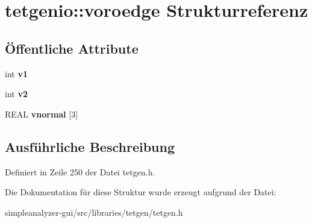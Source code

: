 \hypertarget{structtetgenio_1_1voroedge}{\section{tetgenio\-:\-:voroedge Strukturreferenz}
\label{structtetgenio_1_1voroedge}
}
\subsection*{Öffentliche Attribute}
\begin{DoxyCompactItemize}
\item 
\hypertarget{structtetgenio_1_1voroedge_a2c18bda2392af5f81bc790a2c0ea3139}{int {\bfseries v1}}\label{structtetgenio_1_1voroedge_a2c18bda2392af5f81bc790a2c0ea3139}

\item 
\hypertarget{structtetgenio_1_1voroedge_a19a27882ca68a89123965f7b08e05d55}{int {\bfseries v2}}\label{structtetgenio_1_1voroedge_a19a27882ca68a89123965f7b08e05d55}

\item 
\hypertarget{structtetgenio_1_1voroedge_afea78ad75784a868068e6d86c21531a3}{R\-E\-A\-L {\bfseries vnormal} \mbox{[}3\mbox{]}}\label{structtetgenio_1_1voroedge_afea78ad75784a868068e6d86c21531a3}

\end{DoxyCompactItemize}


\subsection{Ausführliche Beschreibung}


Definiert in Zeile 250 der Datei tetgen.\-h.



Die Dokumentation für diese Struktur wurde erzeugt aufgrund der Datei\-:\begin{DoxyCompactItemize}
\item 
simpleanalyzer-\/gui/src/libraries/tetgen/tetgen.\-h\end{DoxyCompactItemize}
